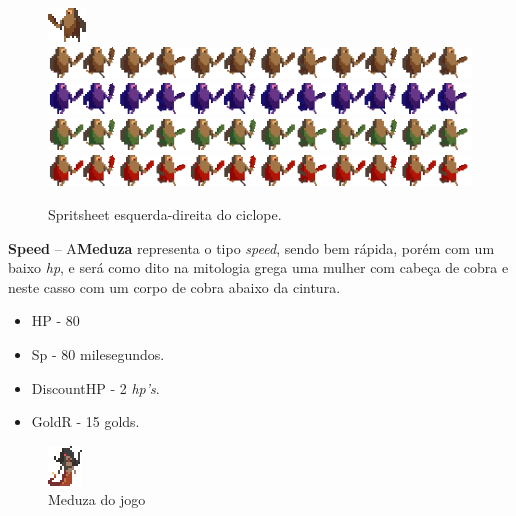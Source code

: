 \documentclass[11pt]{article} %
\begin{document}
\begin{figure}[!htp]
\centering
\advance\leftskip-3cm
\advance\rightskip-3cm
\includegraphics[scale=2]{res/units/ciclope/cyclop.png} \quad
\includegraphics[scale=1]{res/units/ciclope/ciclopsheet.png} \quad
\includegraphics[scale=1]{res/units/ciclope/ciclopsheet_congelado.png} \quad
\includegraphics[scale=1]{res/units/ciclope/ciclopsheet_verde.png} \quad
\includegraphics[scale=1]{res/units/ciclope/ciclopsheet_vermelho.png} 
\caption{Spritsheet esquerda-direita do ciclope.}
\label{ciclopesheet}
\end{figure}

\newpage
\textbf{{ {\large Speed}}} – A\textbf{Meduza} representa o tipo \textit{speed}, sendo bem rápida, porém com um baixo \textit{hp}, e será como dito na mitologia grega uma mulher com cabeça de cobra e neste casso com um corpo de cobra abaixo da cintura.

\begin{itemize}
\item HP - 80
\item Sp - 80 milesegundos.
\item DiscountHP - 2 \textit{hp's}.
\item GoldR - 15 golds.
\end{itemize}

\begin{figure}[!htp]
\centering
\includegraphics[scale=4]{res/characters/medusa.png}
\caption{Meduza do jogo}
\label{Medusa}
\end{figure}
\end{document}
